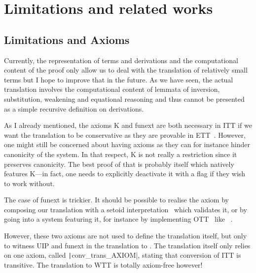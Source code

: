 \chapter{Limitations and related works}

\section{Limitations and Axioms}
\label{sec:axioms}

Currently, the representation of terms and derivations and the
computational content of the proof only allow us to deal with the
translation of relatively small terms but I hope to improve that in
the future. As we have seen, the actual translation involves the
computational content of lemmata of inversion, substitution, weakening
and equational reasoning and thus cannot be presented as a simple
recursive definition on derivations.


As I already mentioned, the axioms K and \acrshort{funext} are both
necessary in \acrshort{ITT} if we want the translation to be conservative as
they are provable in \acrshort{ETT}~.
However, one might still be concerned about having axioms
as they can for instance hinder canonicity of the system.
In that respect, K is not really a restriction since it preserves canonicity.
The best proof of that is probably \Agda itself which natively features K---in
fact, one needs to explicitly deactivate it with a flag if they wish to work
without.

The case of \acrshort{funext} is trickier. It should be possible to realise
the axiom by composing our translation with a setoid
interpretation~ which validates it, or by going into a
system featuring it, for instance by implementing
\acrlong{OTT}~ like
\Epigram~.

However, these two axioms are not used to define the translation itself,
but only to witness \acrshort{UIP} and \acrlong{funext} in the translation to
\Coq.
The translation itself only relies on one axiom, called
\texttt|conv_trans_AXIOM|, stating that conversion
of \acrshort{ITT} is transitive.
The translation to \acrshort{WTT} is totally axiom-free however!


